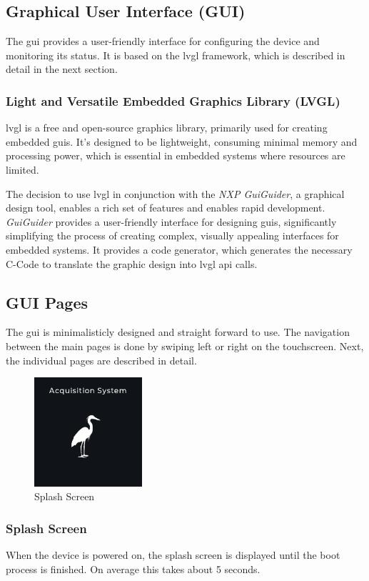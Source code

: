 \newpage
\subsection{Graphical User Interface (GUI)}
The \acrshort{gui} provides a user-friendly interface for configuring the device and monitoring its status.
It is based on the \acrshort{lvgl} framework, which is described in detail in the next section.

\subsubsection{Light and Versatile Embedded Graphics Library (LVGL)}
\acrfull{lvgl} is a free and open-source graphics library, primarily used for creating embedded \acrshort{gui}s.
It's designed to be lightweight, consuming minimal memory and processing power, which is essential in embedded systems where resources are limited.

The decision to use \acrshort{lvgl} in conjunction with the \textit{NXP GuiGuider}, a graphical design tool, enables a rich set of features and enables rapid development.
\textit{GuiGuider} provides a user-friendly interface for designing \acrshort{gui}s, significantly simplifying the process of creating complex, visually appealing interfaces for embedded systems.
It provides a code generator, which generates the necessary C-Code to translate the graphic design into \acrshort{lvgl} \acrshort{api} calls.

\subsection{GUI Pages}
The \acrshort{gui} is minimalisticly designed and straight forward to use.
The navigation between the main pages is done by swiping left or right on the touchscreen.
Next, the individual pages are described in detail.

\begin{minipage}{\linewidth}
	\begin{figure}
		\vspace{-0.6cm}
		\includegraphics[width=4cm]{images/4_design_acquisition_system/gui/01_splash_screen.png}
		\centering
		\caption{Splash Screen}
		\label{fig:acquisition_system_gui_splash_screen}
	\end{figure}
	\subsubsection{Splash Screen}
	When the device is powered on, the splash screen is displayed until the boot process is finished.
	On average this takes about 5 seconds.
\end{minipage}
\vspace{2.9cm}

